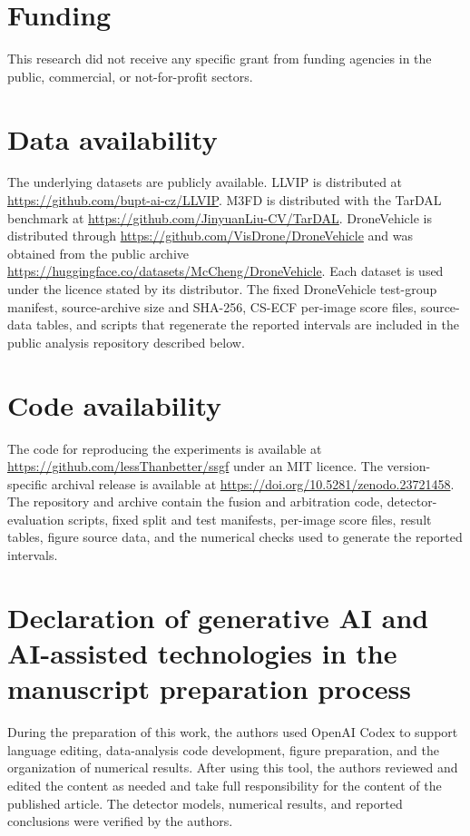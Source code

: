 \documentclass[preprint,11pt]{elsarticle}
\begin{document}
\section*{Funding}

This research did not receive any specific grant from funding agencies in the
public, commercial, or not-for-profit sectors.

\section*{Data availability}

The underlying datasets are publicly available. LLVIP is distributed at
\url{https://github.com/bupt-ai-cz/LLVIP}. M3FD is distributed with the TarDAL
benchmark at \url{https://github.com/JinyuanLiu-CV/TarDAL}. DroneVehicle is
distributed through \url{https://github.com/VisDrone/DroneVehicle} and was
obtained from the public archive
\url{https://huggingface.co/datasets/McCheng/DroneVehicle}. Each dataset is used
under the licence stated by its distributor. The fixed DroneVehicle test-group
manifest, source-archive size and SHA-256, CS-ECF per-image score files,
source-data tables, and scripts that regenerate the reported intervals are
included in the public analysis repository described below.

\section*{Code availability}

The code for reproducing the experiments is available at
\url{https://github.com/lessThanbetter/ssgf} under an MIT licence. The
version-specific archival release is available at
\url{https://doi.org/10.5281/zenodo.23721458}. The repository and archive contain
the fusion and arbitration code, detector-evaluation scripts, fixed split and
test manifests, per-image score files, result tables, figure source data, and
the numerical checks used to generate the reported intervals.

\section*{Declaration of generative AI and AI-assisted technologies in the
manuscript preparation process}

During the preparation of this work, the authors used OpenAI Codex to support
language editing, data-analysis code development, figure preparation, and the
organization of numerical results. After using this tool, the authors reviewed
and edited the content as needed and take full responsibility for the content
of the published article. The detector models, numerical results, and reported
conclusions were verified by the authors.

\begingroup
\footnotesize


\endgroup
\end{document}

